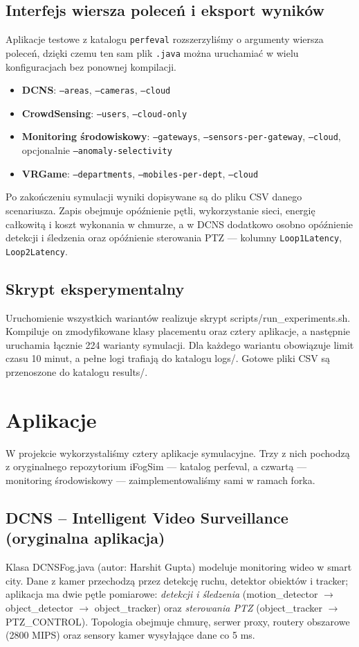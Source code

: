 \documentclass[
    oneside,            %
    left=2.5cm,         %
    right=2.5cm,        %
    top=2.5cm,          %
    bottom=3cm,         %
    bindingoffset=6mm,  %
    nohyphenation=false %
]{eiti/eiti-report}
\begin{document}
\subsection{Interfejs wiersza poleceń i eksport wyników}
Aplikacje testowe z katalogu \texttt{perfeval} rozszerzyliśmy o argumenty wiersza poleceń, dzięki czemu ten sam plik \texttt{.java} można uruchamiać w wielu konfiguracjach bez ponownej kompilacji.

\begin{itemize}[noitemsep,topsep=2pt]
    \item \textbf{DCNS}: \texttt{--areas}, \texttt{--cameras}, \texttt{--cloud}
    \item \textbf{CrowdSensing}: \texttt{--users}, \texttt{--cloud-only}
    \item \textbf{Monitoring środowiskowy}: \texttt{--gateways}, \texttt{--sensors-per-gateway}, \texttt{--cloud}, opcjonalnie \texttt{--anomaly-selectivity}
    \item \textbf{VRGame}: \texttt{--departments}, \texttt{--mobiles-per-dept}, \texttt{--cloud}
\end{itemize}

Po zakończeniu symulacji wyniki dopisywane są do pliku CSV danego scenariusza. Zapis obejmuje opóźnienie pętli, wykorzystanie sieci, energię całkowitą i koszt wykonania w chmurze, a w DCNS dodatkowo osobno opóźnienie detekcji i śledzenia oraz opóźnienie sterowania PTZ — kolumny \texttt{Loop1Latency}, \texttt{Loop2Latency}.

\subsection{Skrypt eksperymentalny}
Uruchomienie wszystkich wariantów realizuje skrypt scripts/run\_experiments.sh. Kompiluje on zmodyfikowane klasy placementu oraz cztery aplikacje, a następnie uruchamia łącznie 224 warianty symulacji. Dla każdego wariantu obowiązuje limit czasu 10 minut, a pełne logi trafiają do katalogu logs/. Gotowe pliki CSV są przenoszone do katalogu results/.

\section{Aplikacje}
W projekcie wykorzystaliśmy cztery aplikacje symulacyjne. Trzy z nich pochodzą z oryginalnego repozytorium iFogSim — katalog perfeval, a czwartą — monitoring środowiskowy — zaimplementowaliśmy sami w ramach forka.

\subsection{DCNS – Intelligent Video Surveillance (oryginalna aplikacja)}
Klasa DCNSFog.java (autor: Harshit Gupta) modeluje monitoring wideo w smart city. Dane z kamer przechodzą przez detekcję ruchu, detektor obiektów i tracker; aplikacja ma dwie pętle pomiarowe: \emph{detekcji i śledzenia} (motion\_detector $\rightarrow$ object\_detector $\rightarrow$ object\_tracker) oraz \emph{sterowania PTZ} (object\_tracker $\rightarrow$ PTZ\_CONTROL). Topologia obejmuje chmurę, serwer proxy, routery obszarowe (2800 MIPS) oraz sensory kamer wysyłające dane co 5 ms.
\end{document}

